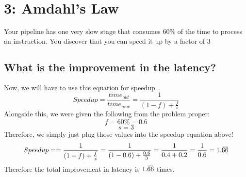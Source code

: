 \documentclass{article}
\newcommand{\overbar}[1]{\mkern 1.5mu\overline{\mkern-1.5mu#1\mkern-1.5mu}\mkern 1.5mu}
\begin{document}
\section{3: Amdahl's Law}
Your pipeline has one very slow stage that consumes 60\% of the time to process an instruction. You discover that you can speed it up by a factor of 3

\subsection{What is the improvement in the latency?}
Now, we will have to use this equation for speedup...
$$ Speedup = \frac{time_{old}}{time_{new}} = \frac{1}{(1-f)+\frac{f}{s}} $$
Alongside this, we were given the following from the problem proper:
$$ f = 60\% = 0.6 $$
$$ s = 3 $$
Therefore, we simply just plug those values into the speedup equation above!
$$ Speedup = = \frac{1}{(1-f)+\frac{f}{s}} = \frac{1}{(1-0.6)+\frac{0.6}{3}} = \frac{1}{0.4 + 0.2} = \frac{1}{0.6} = 1.\overbar{66} $$
Therefore the total improvement in latency is $1.\overbar{66}$ times.
\end{document}
